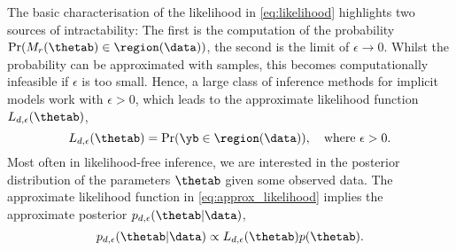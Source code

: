 The basic characterisation of the likelihood in \eqref{eq:likelihood} highlights two sources of intractability: The first is the computation of the probability $\Pr(M_r(\thetab) \in \region(\data))$, the second is the limit of $\epsilon \to 0$.
Whilst the probability can be approximated with samples, this becomes computationally infeasible if $\epsilon$ is too small. Hence, a large class of inference methods for implicit models work with $\epsilon >0$, which leads to the approximate likelihood function  $L_{d, \epsilon}(\thetab)$,
\begin{equation} \label{eq:approx_likelihood}
  L_{d, \epsilon}(\thetab) = \Pr(\yb \in \region(\data)), \quad \text{where  } \epsilon > 0.
\end{equation}
Most often in likelihood-free inference, we are interested in the posterior distribution of the parameters $\thetab$ given some observed data. The approximate likelihood function in \eqref{eq:approx_likelihood} implies the approximate posterior  $p_{d,\epsilon}(\thetab|\data)$, 
\begin{equation} \label{eq:approx_posterior}
  p_{d,\epsilon}(\thetab|\data) \propto L_{d, \epsilon}(\thetab) p(\thetab).
\end{equation}





